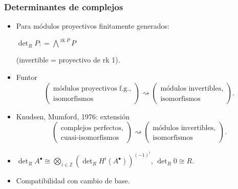 \documentclass[handout]{beamer}
\newcommand{\ZZ}{\mathbb{Z}}
\newcommand{\dfn}{\mathrel{\mathop:}=}
\DeclareMathOperator{\rk}{rk}
\begin{document}

\begin{frame}
  \frametitle{Determinantes de complejos}

  \begin{itemize}
  \item<2-> Para módulos proyectivos finitamente generados:

    $\det\nolimits_R P \dfn \bigwedge^{\rk P} P$

    (invertible = proyectivo de rk 1).

  \item<3-> Funtor
    \[ \left(\!\!\begin{array}{c}
              \text{módulos proyectivos f.g.}, \\
              \text{isomorfismos}
       \end{array}\!\!\right) \rightsquigarrow
       \left(\!\!\begin{array}{c}
               \text{módulos invertibles}, \\
               \text{isomorfismos}
       \end{array}\!\!\right). \]

  \item<4-> Knudsen, Mumford, 1976: extensión
    \[ \left(\!\!\begin{array}{c}
              \text{complejos perfectos}, \\
              \text{cuasi-isomorfismos}
       \end{array}\!\!\right) \rightsquigarrow
       \left(\!\!\begin{array}{c}
                \text{módulos invertibles}, \\
                \text{isomorfismos}
       \end{array}\!\!\right). \]

 \item<5-> $\det\nolimits_R A^\bullet \cong \bigotimes_{i\in \ZZ} (\det_R H^i (A^\bullet))^{(-1)^i}$,
   $\det\nolimits_R 0 \cong R$.

  \item<6-> Compatibilidad con cambio de base.
  \end{itemize}
\end{frame}

\end{document}
